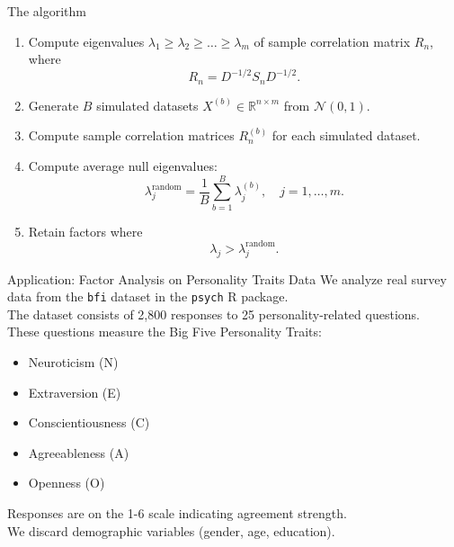 \documentclass[11pt,handout,aspectratio=169]{beamer}
\begin{document}
\begin{frame}{The algorithm}
  \begin{enumerate}
    \item Compute eigenvalues \( \lambda_1 \geq \lambda_2 \geq \dots \geq \lambda_m \) of sample correlation matrix \( R_n \), where
    \begin{equation}
      R_n = D^{-1/2} S_n D^{-1/2}.
    \end{equation}
    \item Generate \( B \) simulated datasets \( X^{(b)} \in \mathbb{R}^{n \times m} \) from \( \mathcal{N}(0,1) \).
    \item Compute sample correlation matrices \( R_n^{(b)} \) for each simulated dataset.
    \item Compute average null eigenvalues:
    \begin{equation}
      \lambda_j^{\text{random}} = \frac{1}{B} \sum_{b=1}^{B} \lambda_j^{(b)}, \quad j = 1, \dots, m.
    \end{equation}
    \item Retain factors where
    \begin{equation}
      \lambda_j > \lambda_j^{\text{random}}.
    \end{equation}
  \end{enumerate}
\end{frame}


\begin{frame}{Application: Factor Analysis on Personality Traits Data}
We analyze real survey data from the \texttt{bfi} dataset in the \texttt{psych} R package.\\[4mm]
The dataset consists of 2,800 responses to 25 personality-related questions.\\[4mm]
These questions measure the Big Five Personality Traits:
    \begin{itemize}
      \item Neuroticism (N)
      \item Extraversion (E)
      \item Conscientiousness (C)
      \item Agreeableness (A)
      \item Openness (O)
    \end{itemize}
Responses are on the 1-6 scale indicating agreement strength.\\[4mm]

We discard demographic variables (gender, age, education).
\end{frame}
\end{document}
